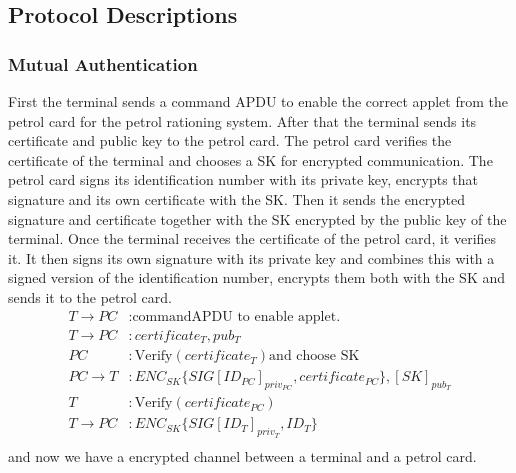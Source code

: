 



\subsection{Protocol Descriptions}
\subsubsection{Mutual Authentication}
First the terminal sends a command APDU to enable the correct applet from the petrol card for the petrol rationing system. After that the terminal sends its certificate and public key to the petrol card. The petrol card verifies the certificate of the terminal and chooses a SK for encrypted communication. The petrol card signs its identification number with its private key, encrypts that signature and its own certificate with the SK. Then it sends the encrypted signature and certificate together with the SK encrypted by the public key of the terminal. Once the terminal receives the certificate of the petrol card, it verifies it. It then signs its own signature with its private key and combines this with a signed version of the identification number, encrypts them both with the SK and sends it to the petrol card.
\\

\begin{equation}\nonumber
\begin{split} 
T \to PC &: \text{commandAPDU to enable applet.}\\
T \to PC &: certificate_{T}, pub_{T}\\ 
PC &: \text{Verify}(certificate_{T}) \text{and choose SK}\\
PC \to T &: ENC_{SK}\{SIG[ID_{PC}]_{priv_{PC}}, certificate_{PC}\},  [SK]_{pub_T}\\
T&: \text{Verify}(certificate_{PC})\\
T \to PC &: ENC_{SK}\{SIG[ID_{T}]_{priv_T}, ID_{T}\} \\ 
\end{split} 
\end{equation}
and now we have a encrypted channel between a terminal and a petrol card.

